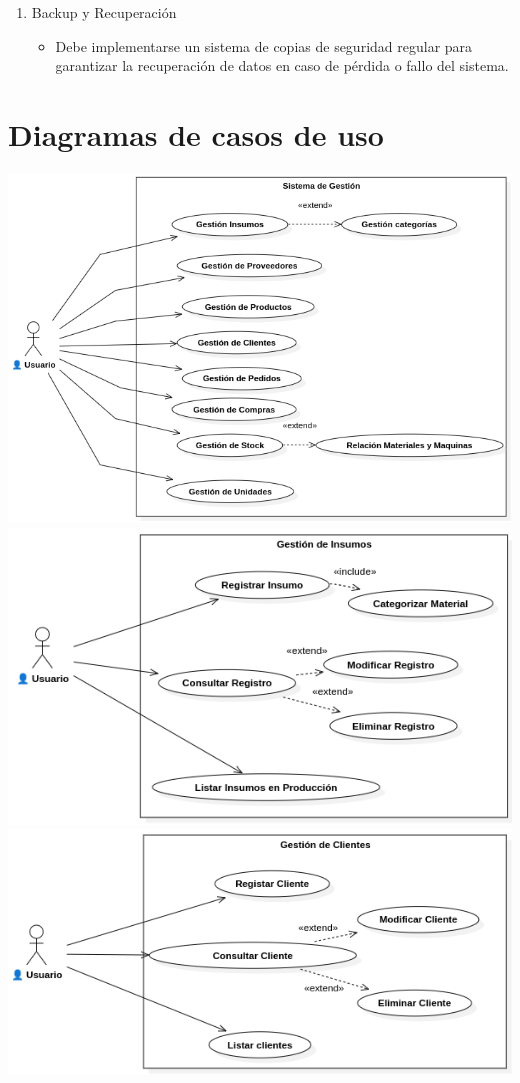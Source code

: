 \documentclass{article}
\begin{document}
\begin{enumerate}[start=7]
	\item Backup y Recuperación
	\begin{itemize}
		\item Debe implementarse un sistema de copias de seguridad regular para garantizar la recuperación de datos en caso de pérdida o fallo del sistema.
	\end{itemize}
\end{enumerate}

\section{Diagramas de casos de uso}
	\begin{center}
		\includegraphics[width=1\linewidth]{imagenes/cu_sistema_de_gestion.png}
		\includegraphics[width=1\linewidth]{imagenes/cu_gestion_de_insumos.png}
		\includegraphics[width=1\linewidth]{imagenes/cu_gestion_clientes.png}

\end{center}
\end{document}
